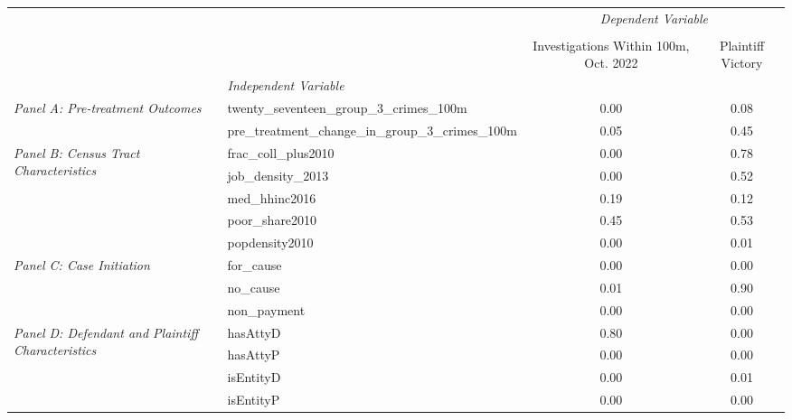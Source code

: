 \begin{tabular}{llcc}
\toprule
 &  & \multicolumn{2}{c}{\textit{Dependent Variable}} \\
\cline{3-4}
\\
 &  & Investigations Within 100m, Oct. 2022 & Plaintiff Victory \\
 & \emph{Independent Variable} &  &  \\
\midrule
\multirow[c]{2}{3cm}{\textit{Panel A: Pre-treatment Outcomes}} & twenty_seventeen_group_3_crimes_100m & 0.00 & 0.08 \\
 & pre_treatment_change_in_group_3_crimes_100m & 0.05 & 0.45 \\
\cline{1-4}
\multirow[c]{5}{3cm}{\textit{Panel B: Census Tract Characteristics}} & frac_coll_plus2010 & 0.00 & 0.78 \\
 & job_density_2013 & 0.00 & 0.52 \\
 & med_hhinc2016 & 0.19 & 0.12 \\
 & poor_share2010 & 0.45 & 0.53 \\
 & popdensity2010 & 0.00 & 0.01 \\
\cline{1-4}
\multirow[c]{3}{3cm}{\textit{Panel C: Case Initiation}} & for_cause & 0.00 & 0.00 \\
 & no_cause & 0.01 & 0.90 \\
 & non_payment & 0.00 & 0.00 \\
\cline{1-4}
\multirow[c]{4}{3cm}{\textit{Panel D: Defendant and Plaintiff Characteristics}} & hasAttyD & 0.80 & 0.00 \\
 & hasAttyP & 0.00 & 0.00 \\
 & isEntityD & 0.00 & 0.01 \\
 & isEntityP & 0.00 & 0.00 \\
\cline{1-4}
\bottomrule
\end{tabular}
